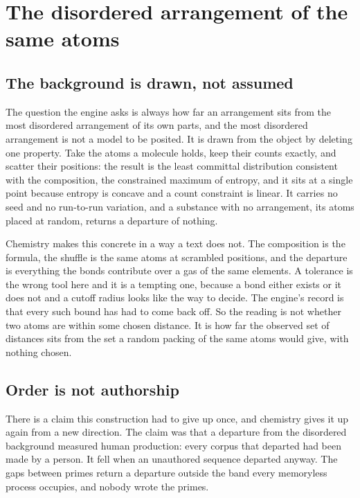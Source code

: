 \chapter{The disordered arrangement of the same atoms}

\section{The background is drawn, not assumed}

The question the engine asks is always how far an arrangement sits from the most disordered
arrangement of its own parts, and the most disordered arrangement is not a model to be posited. It is
drawn from the object by deleting one property. Take the atoms a molecule holds, keep their counts
exactly, and scatter their positions: the result is the least committal distribution consistent with
the composition, the constrained maximum of entropy, and it sits at a single point because entropy is
concave and a count constraint is linear. It carries no seed and no run-to-run variation, and a
substance with no arrangement, its atoms placed at random, returns a departure of nothing.

Chemistry makes this concrete in a way a text does not. The composition is the formula, the shuffle
is the same atoms at scrambled positions, and the departure is everything the bonds contribute over a
gas of the same elements. A tolerance is the wrong tool here and it is a tempting one, because a bond
either exists or it does not and a cutoff radius looks like the way to decide. The engine's record is
that every such bound has had to come back off. So the reading is not whether two atoms are within
some chosen distance. It is how far the observed set of distances sits from the set a random packing
of the same atoms would give, with nothing chosen.

\section{Order is not authorship}

There is a claim this construction had to give up once, and chemistry gives it up again from a new
direction. The claim was that a departure from the disordered background measured human production:
every corpus that departed had been made by a person. It fell when an unauthored sequence departed
anyway. The gaps between primes return a departure outside the band every memoryless process
occupies, and nobody wrote the primes.

